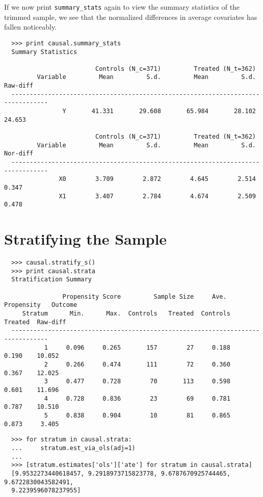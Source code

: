 \documentclass[12pt]{article}
\theoremstyle{definition}
\theoremstyle{definition}
\theoremstyle{definition}
\theoremstyle{remark}
\begin{document}
If we now print \texttt{summary\_stats} again to view the summary statistics of the trimmed sample, we see that the normalized differences in average covariates has fallen noticeably.

\begin{verbatim}
  >>> print causal.summary_stats
  Summary Statistics
  
                         Controls (N_c=371)         Treated (N_t=362)             
         Variable         Mean         S.d.         Mean         S.d.     Raw-diff
  --------------------------------------------------------------------------------
                Y       41.331       29.608       65.984       28.102       24.653
  
                         Controls (N_c=371)         Treated (N_t=362)             
         Variable         Mean         S.d.         Mean         S.d.     Nor-diff
  --------------------------------------------------------------------------------
               X0        3.709        2.872        4.645        2.514        0.347
               X1        3.407        2.784        4.674        2.509        0.478
\end{verbatim}

\section*{Stratifying the Sample}

\begin{verbatim}
  >>> causal.stratify_s()
  >>> print causal.strata
  Stratification Summary
  
                Propensity Score         Sample Size     Ave. Propensity   Outcome
     Stratum      Min.      Max.  Controls   Treated  Controls   Treated  Raw-diff
  --------------------------------------------------------------------------------
           1     0.096     0.265       157        27     0.188     0.190    10.052
           2     0.266     0.474       111        72     0.360     0.367    12.025
           3     0.477     0.728        70       113     0.598     0.601    11.696
           4     0.728     0.836        23        69     0.781     0.787    10.510
           5     0.838     0.904        10        81     0.865     0.873     3.405
\end{verbatim}

\begin{verbatim}
  >>> for stratum in causal.strata:
  ...     stratum.est_via_ols(adj=1)
  ... 
  >>> [stratum.estimates['ols']['ate'] for stratum in causal.strata]
  [9.9532273440618457, 9.2918973715823778, 9.6787670925744465, 9.6722830043582491,
  9.2239596078237955]
\end{verbatim}
\end{document}
